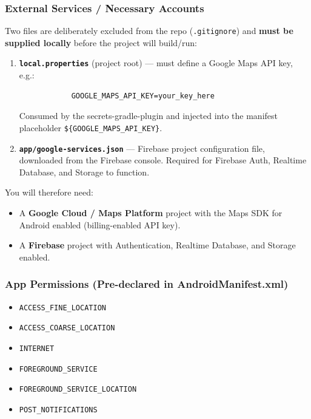 \documentclass{article}
\begin{document}
                    \subsubsection*{External Services / Necessary Accounts}

                    Two files are deliberately excluded from the repo (\texttt{.gitignore}) and \textbf{must be supplied locally} before the project will build/run:

                    \begin{enumerate}
                        \item \textbf{\texttt{local.properties}} (project root) --- must define a Google Maps API key, e.g.:
                        \begin{center}
                            \begin{verbatim}
            GOOGLE_MAPS_API_KEY=your_key_here
                            \end{verbatim}
                        \end{center}
                        Consumed by the secrets-gradle-plugin and injected into the manifest placeholder \texttt{\$\{GOOGLE\_MAPS\_API\_KEY\}}.
                        \item \textbf{\texttt{app/google-services.json}} --- Firebase project configuration file, downloaded from the Firebase console. Required for Firebase Auth, Realtime Database, and Storage to function.
                    \end{enumerate}

                    You will therefore need:
                    \begin{itemize}
                        \item A \textbf{Google Cloud / Maps Platform} project with the Maps SDK for Android enabled (billing-enabled API key).
                        \item A \textbf{Firebase} project with Authentication, Realtime Database, and Storage enabled.
                    \end{itemize}

                    \subsubsection*{App Permissions (Pre-declared in AndroidManifest.xml)}

                        \begin{itemize}
                            \item \texttt{ACCESS\_FINE\_LOCATION}
                            \item \texttt{ACCESS\_COARSE\_LOCATION}
                            \item \texttt{INTERNET}
                            \item \texttt{FOREGROUND\_SERVICE}
                            \item \texttt{FOREGROUND\_SERVICE\_LOCATION}
                            \item \texttt{POST\_NOTIFICATIONS}
                        \end{itemize}
\end{document}
